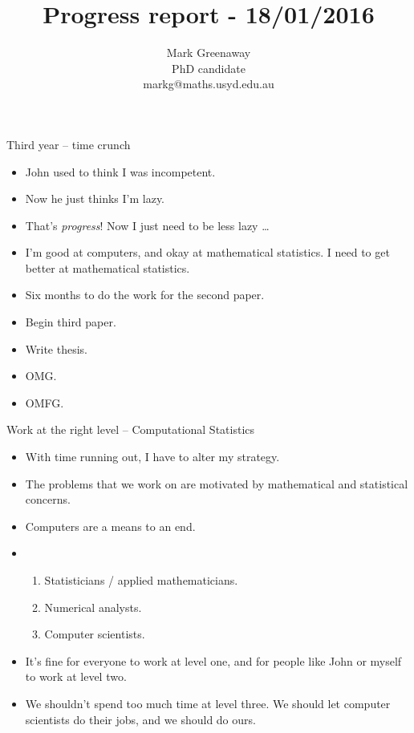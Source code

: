 \documentclass{beamer}
\title{Progress report - 18/01/2016}
\author{Mark Greenaway\\PhD candidate\\markg@maths.usyd.edu.au}
\begin{document}
\begin{frame}
\maketitle
\end{frame}

\begin{frame}{Third year -- time crunch}
\begin{itemize}
\item John used to think I was incompetent.
\item Now he just thinks I'm lazy.
\item That's \emph{progress}! Now I just need to be less lazy \ldots
\item I'm good at computers, and okay at mathematical statistics. I need to get better at mathematical statistics.
\item Six months to do the work for the second paper.
\item Begin third paper.
\item Write thesis.
\item OMG.
\item OMFG.
\end{itemize}
\end{frame}

\begin{frame}{Work at the right level -- Computational Statistics}

\begin{itemize}
\item With time running out, I have to alter my strategy.
\item The problems that we work on are motivated by mathematical and statistical concerns.
\item Computers are a means to an end.

\item \begin{enumerate}
\item Statisticians / applied mathematicians.
\item Numerical analysts.
\item Computer scientists.
\end{enumerate}

\item It's fine for everyone to work at level one, and for people like John or
myself to work at level two. 
\item We shouldn't spend too much time at level
three. We should let computer scientists do their jobs, and we should do ours.

\end{itemize}
\end{frame}
\end{document}
